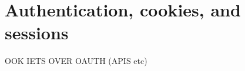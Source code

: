 \section{Authentication, cookies, and sessions}
\label{sec:authentication}



OOK IETS OVER OAUTH (APIS etc)

